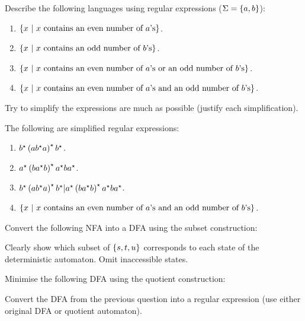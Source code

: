 \documentclass{article}
\begin{document}
\begin{question}
Describe the following languages using regular expressions ($\Sigma=\left\{ a,b \right\}$):
\begin{enumerate}
 \item $\left\{ x\ |\ \mbox{$x$ contains an even number of $a$'s} \right\}$.
 \item $\left\{ x\ |\ \mbox{$x$ contains an odd number of $b$'s} \right\}$.
 \item $\left\{ x\ |\ \mbox{$x$ contains an even number of $a$'s or an odd number of $b$’s} \right\}$.
 \item $\left\{ x\ |\ \mbox{$x$ contains an even number of $a$'s and an odd number of $b$’s} \right\}$.
\end{enumerate}
Try to simplify the expressions are much as possible (justify each simplification).
\begin{answer}
The following are simplified regular expressions:
\begin{enumerate}
 \item $b^{\star}\left( ab^{\star}a \right)^{\star}b^{\star}$.
 \item $a^{\star}\left( ba^{\star}b \right)^{\star}a^{\star}ba^{\star}$.
 \item $b^{\star}\left( ab^{\star}a \right)^{\star}b^{\star}|a^{\star}\left( ba^{\star}b \right)^{\star}a^{\star}ba^{\star}$.
 \item $\left\{ x\ |\ \mbox{$x$ contains an even number of $a$'s and an odd number of $b$’s} \right\}$.
\end{enumerate}
\end{answer}
\end{question}
\begin{question}
Convert the following NFA into a DFA using the subset construction:


Clearly show which subset of $\left\{ s,t,u \right\}$ corresponds to each state of the deterministic automaton. Omit inaccessible states.
\begin{answer}
\end{answer}
\end{question}
\begin{question}
Minimise the following DFA using the quotient construction:
\begin{answer}
\end{answer}
\end{question}
\begin{question}
Convert the DFA from the previous question into a regular expression (use either original DFA or quotient automaton).
\begin{answer}
\end{answer}
\end{question}
\end{document}
